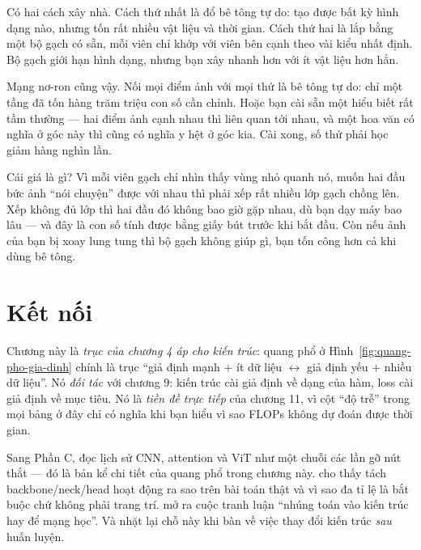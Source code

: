 \documentclass[../../deep_learning.tex]{subfiles}
\begin{document}
\begin{dongian}
Có hai cách xây nhà. Cách thứ nhất là đổ bê tông tự do: tạo được bất kỳ hình dạng nào, nhưng tốn rất nhiều vật liệu và thời gian. Cách thứ hai là lắp bằng một bộ gạch có sẵn, mỗi viên chỉ khớp với viên bên cạnh theo vài kiểu nhất định. Bộ gạch giới hạn hình dạng, nhưng bạn xây nhanh hơn với ít vật liệu hơn hẳn.

Mạng nơ-ron cũng vậy. Nối mọi điểm ảnh với mọi thứ là bê tông tự do: chỉ một tầng đã tốn hàng trăm triệu con số cần chỉnh. Hoặc bạn cài sẵn một hiểu biết rất tầm thường --- hai điểm ảnh cạnh nhau thì liên quan tới nhau, và một hoa văn có nghĩa ở góc này thì cũng có nghĩa y hệt ở góc kia. Cài xong, số thứ phải học giảm hàng nghìn lần.

Cái giá là gì? Vì mỗi viên gạch chỉ nhìn thấy vùng nhỏ quanh nó, muốn hai đầu bức ảnh ``nói chuyện'' được với nhau thì phải xếp rất nhiều lớp gạch chồng lên. Xếp không đủ lớp thì hai đầu đó không bao giờ gặp nhau, dù bạn dạy máy bao lâu --- và đây là con số tính được bằng giấy bút trước khi bắt đầu. Còn nếu ảnh của bạn bị xoay lung tung thì bộ gạch không giúp gì, bạn tốn công hơn cả khi dùng bê tông.

\end{dongian}

\section{Kết nối}

Chương này là \emph{trục của chương 4 áp cho kiến trúc}: quang phổ ở Hình~\ref{fig:quang-pho-gia-dinh} chính là trục ``giả định mạnh \(+\) ít dữ liệu \(\leftrightarrow\) giả định yếu \(+\) nhiều dữ liệu''. Nó \emph{đối tác} với chương 9: kiến trúc cài giả định về dạng của hàm, loss cài giả định về mục tiêu. Nó là \emph{tiền đề trực tiếp} của chương 11, vì cột ``độ trễ'' trong mọi bảng ở đây chỉ có nghĩa khi bạn hiểu vì sao FLOPs không dự đoán được thời gian.

Sang Phần C,  đọc lịch sử CNN, attention và ViT như một chuỗi các lần gỡ nút thắt --- đó là bản kể chi tiết của quang phổ trong chương này.  cho thấy tách backbone/neck/head hoạt động ra sao trên bài toán thật và vì sao đa tỉ lệ là bắt buộc chứ không phải trang trí.  mở ra cuộc tranh luận ``nhúng toán vào kiến trúc hay để mạng học''. Và  nhặt lại chỗ này khi bàn về việc thay đổi kiến trúc \emph{sau} huấn luyện.
\end{document}
